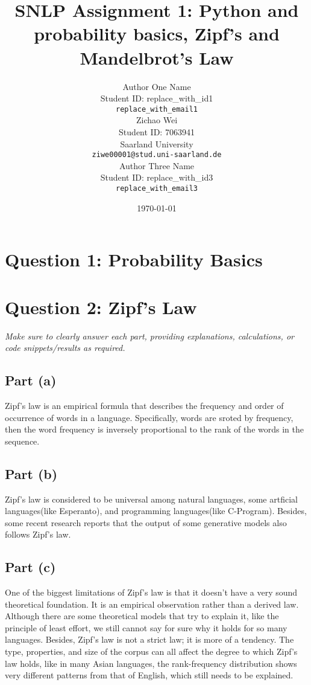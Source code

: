 \documentclass{article}
\title{SNLP Assignment 1: Python and probability basics, Zipf's and Mandelbrot's Law} %
\author{
  Author One Name \\
  Student ID: replace\_with\_id1 \\ %
  \texttt{replace\_with\_email1} \\
  \And %
  Zichao Wei \\
  Student ID: 7063941 \\
  Saarland University \\
  \texttt{ziwe00001@stud.uni-saarland.de} \\
  \And %
  Author Three Name \\
  Student ID: replace\_with\_id3 \\ %
  \texttt{replace\_with\_email3} \\
}
\date{\today} %
\begin{document}
\maketitle %


\section{Question 1: Probability Basics}


\section{Question 2: Zipf’s Law}
\textit{Make sure to clearly answer each part, providing explanations, calculations, or code snippets/results as required.}

\subsection{Part (a)}

Zipf's law is an empirical formula that describes the frequency and order of occurrence of words in a language. Specifically, words are sroted by frequency, then the word frequency is inversely proportional to the rank of the words in the sequence.

\subsection{Part (b)}

Zipf's law is considered to be universal among natural languages, some artficial languages(like Esperanto), and programming languages(like C-Program). Besides, some recent research reports that the output of some generative models also follows Zipf's law.

\subsection{Part (c)}

One of the biggest limitations of Zipf's law is that it doesn't have a very sound theoretical foundation. It is an empirical observation rather than a derived law. Although there are some theoretical models that try to explain it, like the principle of least effort, we still cannot say for sure why it holds for so many languages. Besides, Zipf's law is not a strict law; it is more of a tendency. The type, properties, and size of the corpus can all affect the degree to which Zipf's law holds, like in many Asian languages, the rank-frequency distribution shows very different patterns from that of English, which still needs to be explained.


\end{document}

